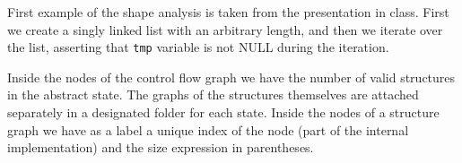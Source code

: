 First example of the shape analysis is taken from the presentation in class. First we create a singly linked list with an arbitrary length, and then we iterate over the list, asserting that \texttt{tmp} variable is not NULL during the iteration.

Inside the nodes of the control flow graph we have the number of valid structures in the abstract state. The graphs of the structures themselves are attached separately in a designated folder for each state. Inside the nodes of a structure graph we have as a label a unique index of the node (part of the internal implementation) and the size expression in parentheses. 

